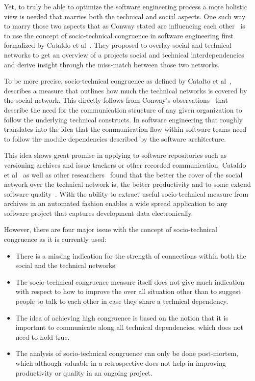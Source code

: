Yet, to truly be able to optimize the software engineering process a more holistic view is needed that marries both the technical and social aspects.
One such way to marry those two aspects that as Conway stated are influencing each other~\cite{conway:datamination:1968} is to use the concept of socio-technical congruence in software engineering first formalized by Cataldo et al~\cite{cataldo:cscw:2006}.
They proposed to overlay social and technical networks to get an overview of a projects social and technical interdependencies and derive insight through the miss-match between those two networks.

To be more precise, socio-technical congruence as defined by Catalto et al~\cite{cataldo:cscw:2006}, describes a measure that outlines how much the technical networks is covered by the social network.
This directly follows from Conway's observations~\cite{conway:datamination:1968} that describe the need for the communication structure of any given organization to follow the underlying technical constructs.
In software engineering that roughly translates into the idea that the communication flow within software teams need to follow the module dependencies described by the software architecture. 
 
This idea shows great promise in applying to software repositories such as versioning archives and issue trackers or other recorded communication.
Cataldo et al~\cite{cataldo:cscw:2006,cataldo:esem:2008} as well as other researchers~\cite{valetto:msr:2007,ehrlich:stc:2008} found that the better the cover of the social network over the technical network is, the better productivity and to some extend software quality~\cite{kwan:tse:2011,bird:issre:2009,kwan:stc:2009}.
With the ability to extract useful socio-technical measure from archives in an automated fashion enables a wide spread application to any software project that captures development data electronically.

However, there are four major issue with the concept of socio-technical congruence as it is currently used:
\begin{itemize}
\item There is a missing indication for the strength of connections within both the social and the technical networks.
\item The socio-technical congruence measure itself does not give much indication with respect to how to improve the over all situation other than to suggest people to talk to each other in case they share a technical dependency. 
\item The idea of achieving high congruence is based on the notion that it is important to communicate along all technical dependencies, which does not need to hold true.
\item The analysis of socio-technical congruence can only be done post-mortem, which although valuable in a retrospective does not help in improving productivity or quality in an ongoing project.
\end{itemize}

